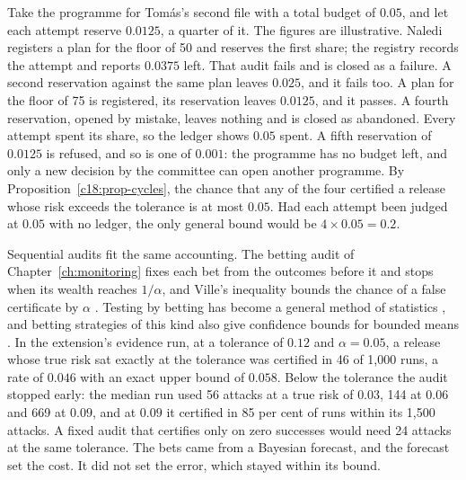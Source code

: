 \begin{example}\label{c18:ex-budget}
Take the programme for Tom\'as's second file with a total budget of $0.05$, and let each attempt reserve $0.0125$, a quarter of it. The
figures are illustrative. Naledi registers a plan for the floor of 50 and reserves the first share;
the registry records the attempt and reports $0.0375$ left. That audit fails and is closed as a
failure. A second reservation against the same plan leaves $0.025$, and it fails too. A plan for
the floor of 75 is registered, its reservation leaves $0.0125$, and it passes. A fourth reservation, opened by mistake, leaves nothing and is closed as abandoned. Every attempt spent
its share, so the ledger shows $0.05$ spent. A fifth reservation of $0.0125$ is refused, and so is
one of $0.001$: the programme has no budget left, and only a new decision by the committee
can open another programme. By Proposition~\ref{c18:prop-cycles}, the chance that any of the four certified
a release whose risk exceeds the tolerance is at most $0.05$. Had each attempt been judged at
$0.05$ with no ledger, the only general bound would be $4\times0.05=0.2$.
\end{example}

Sequential audits fit the same accounting. The betting audit of Chapter~\ref{ch:monitoring} fixes each bet
from the outcomes before it and stops when its wealth reaches $1/\alpha$, and Ville's inequality
bounds the chance of a false certificate by $\alpha$ \citep{ville1939,howard2021}. Testing by betting has become a general method of statistics \citep{shafer2021,ramdas2023,grunwald2024}, and betting strategies of this kind also give confidence bounds for bounded
means \citep{waudbysmith2024}. In the extension's evidence run, at a tolerance of
$0.12$ and $\alpha=0.05$, a release whose true risk sat exactly at the tolerance was certified in 46 of
1,000 runs, a rate of $0.046$ with an exact upper bound of $0.058$. Below the tolerance the audit
stopped early: the median run used 56 attacks at a true risk of $0.03$, 144 at $0.06$ and 669 at
$0.09$, and at $0.09$ it certified in 85 per cent of runs within its 1,500 attacks. A fixed audit that
certifies only on zero successes would need 24 attacks at the same tolerance. The bets came
from a Bayesian forecast, and the forecast set the cost. It did not set the error, which stayed
within its bound.


